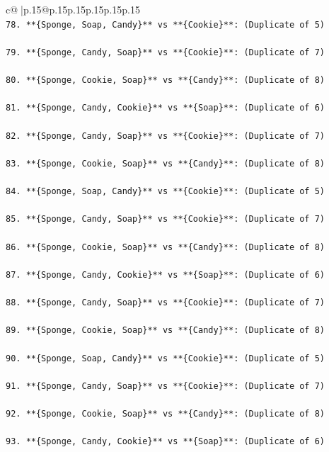 \documentclass{article}
\begin{document}
{\begin{supertabular}{c@{$\;$}|p{.15\linewidth}@{}p{.15\linewidth}p{.15\linewidth}p{.15\linewidth}p{.15\linewidth}p{.15\linewidth}}
{{{\\ 
\texttt{78. **\{Sponge, Soap, Candy\}** vs **\{Cookie\}**: (Duplicate of 5)} \\
\\ 
\texttt{79. **\{Sponge, Candy, Soap\}** vs **\{Cookie\}**: (Duplicate of 7)} \\
\\ 
\texttt{80. **\{Sponge, Cookie, Soap\}** vs **\{Candy\}**: (Duplicate of 8)} \\
\\ 
\texttt{81. **\{Sponge, Candy, Cookie\}** vs **\{Soap\}**: (Duplicate of 6)} \\
\\ 
\texttt{82. **\{Sponge, Candy, Soap\}** vs **\{Cookie\}**: (Duplicate of 7)} \\
\\ 
\texttt{83. **\{Sponge, Cookie, Soap\}** vs **\{Candy\}**: (Duplicate of 8)} \\
\\ 
\texttt{84. **\{Sponge, Soap, Candy\}** vs **\{Cookie\}**: (Duplicate of 5)} \\
\\ 
\texttt{85. **\{Sponge, Candy, Soap\}** vs **\{Cookie\}**: (Duplicate of 7)} \\
\\ 
\texttt{86. **\{Sponge, Cookie, Soap\}** vs **\{Candy\}**: (Duplicate of 8)} \\
\\ 
\texttt{87. **\{Sponge, Candy, Cookie\}** vs **\{Soap\}**: (Duplicate of 6)} \\
\\ 
\texttt{88. **\{Sponge, Candy, Soap\}** vs **\{Cookie\}**: (Duplicate of 7)} \\
\\ 
\texttt{89. **\{Sponge, Cookie, Soap\}** vs **\{Candy\}**: (Duplicate of 8)} \\
\\ 
\texttt{90. **\{Sponge, Soap, Candy\}** vs **\{Cookie\}**: (Duplicate of 5)} \\
\\ 
\texttt{91. **\{Sponge, Candy, Soap\}** vs **\{Cookie\}**: (Duplicate of 7)} \\
\\ 
\texttt{92. **\{Sponge, Cookie, Soap\}** vs **\{Candy\}**: (Duplicate of 8)} \\
\\ 
\texttt{93. **\{Sponge, Candy, Cookie\}** vs **\{Soap\}**: (Duplicate of 6)} \\
}}}
\end{supertabular}}
\end{document}
